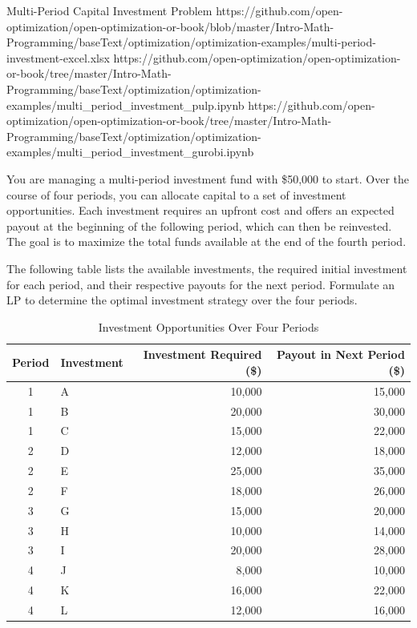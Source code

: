 \begin{examplewithallcode}{Multi-Period Capital Investment Problem}
{https://github.com/open-optimization/open-optimization-or-book/blob/master/Intro-Math-Programming/baseText/optimization/optimization-examples/multi-period-investment-excel.xlsx}
{https://github.com/open-optimization/open-optimization-or-book/tree/master/Intro-Math-Programming/baseText/optimization/optimization-examples/multi_period_investment_pulp.ipynb}
{https://github.com/open-optimization/open-optimization-or-book/tree/master/Intro-Math-Programming/baseText/optimization/optimization-examples/multi_period_investment_gurobi.ipynb}
\label{ex:multi-period-capital-investment}

You are managing a multi-period investment fund with \$50,000 to start. Over the course of four periods, you can allocate capital to a set of investment opportunities. Each investment requires an upfront cost and offers an expected payout at the beginning of the following period, which can then be reinvested. The goal is to maximize the total funds available at the end of the fourth period.

The following table lists the available investments, the required initial investment for each period, and their respective payouts for the next period. Formulate an LP to determine the optimal investment strategy over the four periods.

\end{examplewithallcode}

\begin{table}[h!]
\begin{center}
\begin{tabular} {|c|l|r|r|}
\hline
Period & Investment & Investment Required (\$) & Payout in Next Period (\$) \\
\hline\hline
1 & A & 10{,}000 & 15{,}000 \\
1 & B & 20{,}000 & 30{,}000 \\
1 & C & 15{,}000 & 22{,}000 \\
\hline
2 & D & 12{,}000 & 18{,}000 \\
2 & E & 25{,}000 & 35{,}000 \\
2 & F & 18{,}000 & 26{,}000 \\
\hline
3 & G & 15{,}000 & 20{,}000 \\
3 & H & 10{,}000 & 14{,}000 \\
3 & I & 20{,}000 & 28{,}000 \\
\hline
4 & J &  8{,}000 & 10{,}000 \\
4 & K & 16{,}000 & 22{,}000 \\
4 & L & 12{,}000 & 16{,}000 \\
\hline
\end{tabular}
\caption{Investment Opportunities Over Four Periods}
\label{tab:multi_period_investments}
\end{center}
\end{table}

